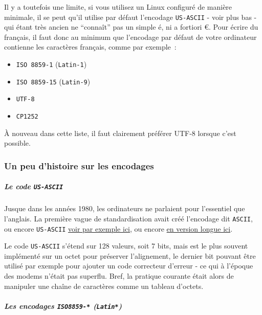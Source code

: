Il y a toutefois une limite, si vous utilisez un Linux configuré de
manière minimale, il se peut qu'il utilise par défaut l'encodage
\texttt{US-ASCII} - voir plus bas - qui étant très ancien ne ``connaît''
pas un simple é, ni a fortiori €. Pour écrire du français, il faut donc
au minimum que l'encodage par défaut de votre ordinateur contienne les
caractères français, comme par exemple~:

\begin{itemize}
\tightlist
\item
  \texttt{ISO\ 8859-1} (\texttt{Latin-1})
\item
  \texttt{ISO\ 8859-15} (\texttt{Latin-9})
\item
  \texttt{UTF-8}
\item
  \texttt{CP1252}
\end{itemize}

À nouveau dans cette liste, il faut clairement préférer UTF-8 lorsque
c'est possible.

    \hypertarget{un-peu-dhistoire-sur-les-encodages}{%
\subsubsection{Un peu d'histoire sur les
encodages}\label{un-peu-dhistoire-sur-les-encodages}}

    \hypertarget{le-code-us-ascii}{%
\subparagraph{\texorpdfstring{Le code
\texttt{US-ASCII}}{Le code US-ASCII}}\label{le-code-us-ascii}}

    Jusque dans les années 1980, les ordinateurs ne parlaient pour
l'essentiel que l'anglais. La première vague de standardisation avait
créé l'encodage dit \texttt{ASCII}, ou encore \texttt{US-ASCII}
\href{http://www.asciitable.com}{voir par exemple ici}, ou encore
\href{http://en.wikipedia.org/wiki/ASCII}{en version longue ici}.

Le code \texttt{US-ASCII} s'étend sur 128 valeurs, soit 7 bits, mais est
le plus souvent implémenté sur un octet pour préserver l'alignement, le
dernier bit pouvant être utilisé par exemple pour ajouter un code
correcteur d'erreur - ce qui à l'époque des modems n'était pas superflu.
Bref, la pratique courante était alors de manipuler une chaîne de
caractères comme un tableau d'octets.

    \hypertarget{les-encodages-iso8859--latin}{%
\subparagraph{\texorpdfstring{Les encodages \texttt{ISO8859-*}
(\texttt{Latin*})}{Les encodages ISO8859-* (Latin*)}}\label{les-encodages-iso8859--latin}}

